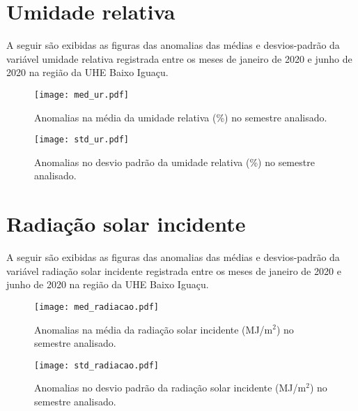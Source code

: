 \documentclass[a4paper,12pt]{article}
\begin{document}
        
        \newpage
        
        \section{Umidade relativa }
        \hspace{0.5cm} A seguir são exibidas as figuras das anomalias das médias e desvios-padrão da variável umidade relativa 
        registrada entre os meses de janeiro de 2020 e junho de 2020 na região da UHE Baixo Iguaçu.
        
        \begin{figure}[!htb]
        \centering
        \texttt{[image: med\_ur.pdf]}
        \caption{Anomalias na média da umidade relativa (\%) no semestre analisado.}
        \label{fig:figmed_ur}
        \end{figure}
        
        \begin{figure}[!htb]
        \centering
        \texttt{[image: std\_ur.pdf]}
        \caption{Anomalias no desvio padrão da umidade relativa (\%) no semestre analisado.}
        \label{fig:figstd_ur}
        \end{figure}  
        
        
        \newpage
        
        \section{Radiação solar incidente }
        \hspace{0.5cm} A seguir são exibidas as figuras das anomalias das médias e desvios-padrão da variável radiação solar incidente 
        registrada entre os meses de janeiro de 2020 e junho de 2020 na região da UHE Baixo Iguaçu.
        
        \begin{figure}[!htb]
        \centering
        \texttt{[image: med\_radiacao.pdf]}
        \caption{Anomalias na média da radiação solar incidente (MJ/m$^2$) no semestre analisado.}
        \label{fig:figmed_radiacao}
        \end{figure}
        
        \begin{figure}[!htb]
        \centering
        \texttt{[image: std\_radiacao.pdf]}
        \caption{Anomalias no desvio padrão da radiação solar incidente (MJ/m$^2$) no semestre analisado.}
        \label{fig:figstd_radiacao}
        \end{figure}  
        
\end{document}
